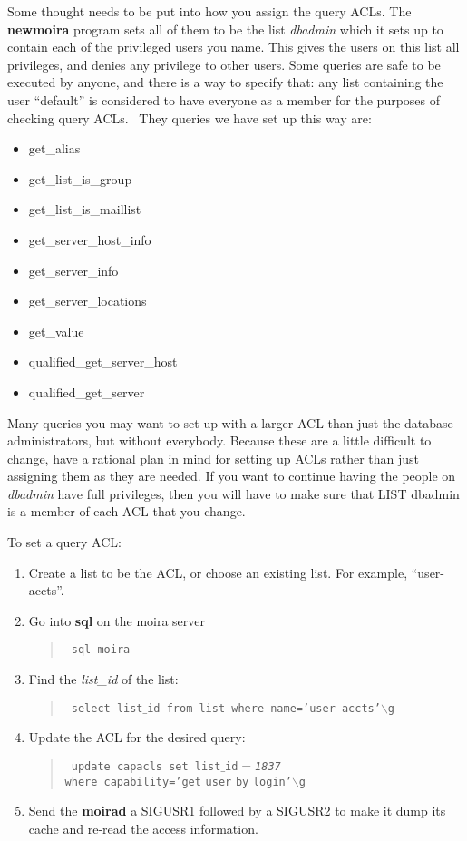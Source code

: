 Some thought needs to be put into how you assign the query ACLs.  The
{\bf newmoira} program sets all of them to be the list {\em dbadmin} which
it sets up to contain each of the privileged users you name.  This
gives the users on this list all privileges, and denies any privilege
to other users.  Some queries are safe to be executed by anyone, and
there is a way to specify that: any list containing the user
``default'' is considered to have everyone as a member for the
purposes of checking query ACLs.  \athena\ They queries we have set
up this way are:
\begin{itemize}
\item get\_alias
\item get\_list\_is\_group
\item get\_list\_is\_maillist
\item get\_server\_host\_info
\item get\_server\_info
\item get\_server\_locations
\item get\_value
\item qualified\_get\_server\_host
\item qualified\_get\_server
\end{itemize}

Many queries you may want to set up with a larger ACL than just the
database administrators, but without everybody.  Because these are a
little difficult to change, have a rational plan in mind for setting
up ACLs rather than just assigning them as they are needed.  If you
want to continue having the people on {\em dbadmin} have full
privileges, then you will have to make sure that LIST dbadmin is a
member of each ACL that you change.

To set a query ACL:
\begin{enumerate}
\item Create a list to be the ACL, or choose an existing list.  For example,
``user-accts''.
\item Go into {\bf sql} on the moira server
\begin{quotation}\tt
\noindent sql moira
\end{quotation}
\item Find the {\em list\_id} of the list:
\begin{quotation}\tt
\noindent select list$\_$id from list where name='user-accts'$\backslash$g
\end{quotation}
\item Update the ACL for the desired query:
\begin{quotation}\tt
\noindent update capacls set list$\_$id$=${\it 1837} \\
where capability='get$\_$user$\_$by$\_$login'$\backslash$g
\end{quotation}
\item Send the {\bf moirad} a SIGUSR1 followed by a SIGUSR2 to make it
dump its cache and re-read the access information.
\end{enumerate}

